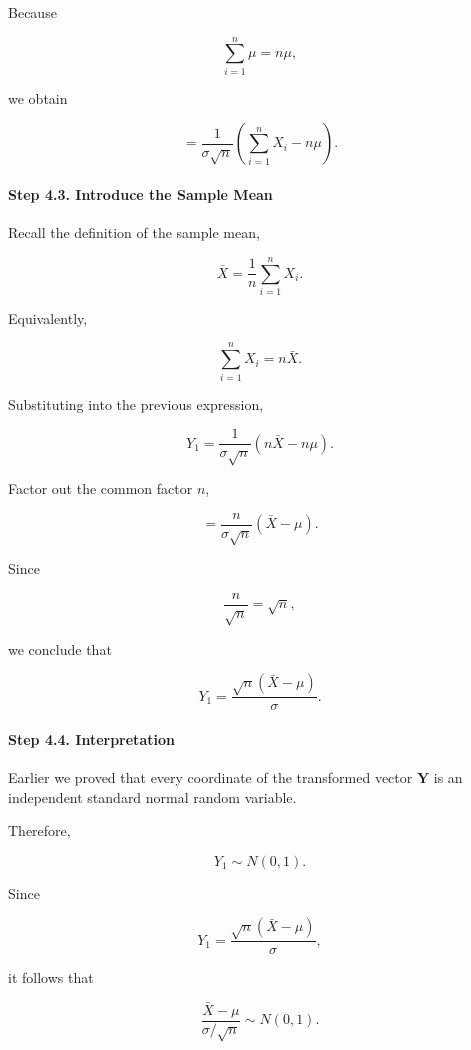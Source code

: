 \documentclass[11pt]{article}
\begin{document}
\begin{mdframed}[
		linewidth=0.8pt,
		roundcorner=6pt,
		backgroundcolor=gray!5,
		linecolor=gray!60,
		innertopmargin=10pt,
		innerbottommargin=10pt,
		innerleftmargin=10pt,
		innerrightmargin=10pt
		]
		Because
		
		\[
		\sum_{i=1}^{n}\mu
		=
		n\mu,
		\]
		
		we obtain
		
		\[
		=
		\frac1{\sigma\sqrt n}
		\left(
		\sum_{i=1}^{n}X_i
		-
		n\mu
		\right).
		\]
		
		\vspace{0.3cm}
		
		\paragraph{Step 4.3. Introduce the Sample Mean}
		
		Recall the definition of the sample mean,
		
		\[
		\bar X
		=
		\frac1n
		\sum_{i=1}^{n}X_i.
		\]
		
		Equivalently,
		
		\[
		\sum_{i=1}^{n}X_i
		=
		n\bar X.
		\]
		
		Substituting into the previous expression,
		
		\[
		Y_1
		=
		\frac1{\sigma\sqrt n}
		(n\bar X-n\mu).
		\]
		
		Factor out the common factor $n$,
		
		\[
		=
		\frac{n}{\sigma\sqrt n}
		(\bar X-\mu).
		\]
		
		Since
		
		\[
		\frac{n}{\sqrt n}
		=
		\sqrt n,
		\]
		
		we conclude that
		
		\[
		\boxed{
			Y_1
			=
			\frac{\sqrt n(\bar X-\mu)}
			{\sigma}.
		}
		\]
		
		\vspace{0.3cm}
		
		\paragraph{Step 4.4. Interpretation}
		
		Earlier we proved that every coordinate of the transformed vector
		$\mathbf Y$ is an independent standard normal random variable.
		
		Therefore,
		
		\[
		Y_1
		\sim
		N(0,1).
		\]
		
		Since
		
		\[
		Y_1
		=
		\frac{\sqrt n(\bar X-\mu)}
		{\sigma},
		\]
		
		it follows that
		
		\[
		\boxed{
			\frac{\bar X-\mu}
			{\sigma/\sqrt n}
			\sim
			N(0,1).
		}
		\]
		

\end{mdframed}
\end{document}

